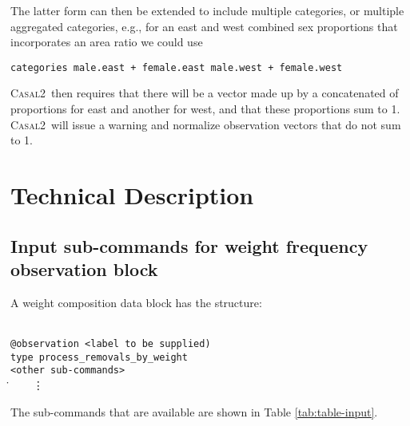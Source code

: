 \documentclass[a4paper,11pt,twoside,pdftex,draft]{article}
\newcommand{\CNAME}{\textsc{Casal2}}
\begin{document}
The latter form can then be extended to include multiple categories, or multiple aggregated categories, e.g., for an east and west combined sex proportions that incorporates an area ratio we could use

\texttt{categories male.east + female.east   male.west + female.west}

\CNAME~then requires that there will be a vector made up by a concatenated of proportions for east and another for west, and that these proportions sum to 1. \CNAME~will issue a warning and normalize observation vectors that do not sum to 1.

\section{Technical Description}

\subsection{Input sub-commands for weight frequency observation block}

A weight composition data block has the structure:

\texttt{\\
@observation <label to be supplied)\\
type process\_removals\_by\_weight\\
<other sub-commands>\\
}
\.~~~~\vdots


The sub-commands that are available are shown in Table \ref{tab:table-input}.
\end{document}
